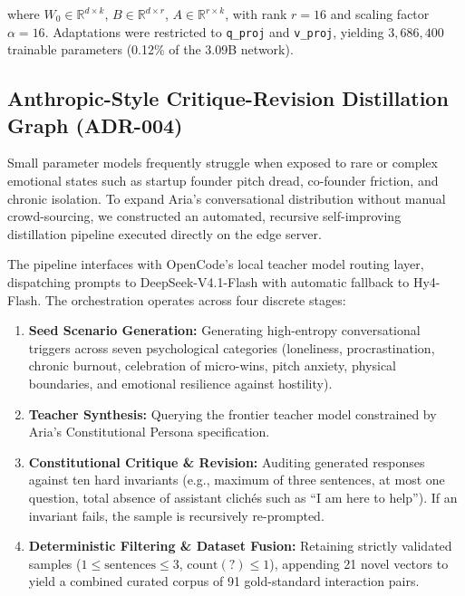 \documentclass[10pt,a4paper]{article}
\begin{document}
where $W_0 \in \mathbb{R}^{d \times k}$, $B \in \mathbb{R}^{d \times r}$, $A \in \mathbb{R}^{r \times k}$, with rank $r = 16$ and scaling factor $\alpha = 16$. Adaptations were restricted to \texttt{q\_proj} and \texttt{v\_proj}, yielding $3,686,400$ trainable parameters (0.12\% of the 3.09B network).

\subsection{Anthropic-Style Critique-Revision Distillation Graph (ADR-004)}
Small parameter models frequently struggle when exposed to rare or complex emotional states such as startup founder pitch dread, co-founder friction, and chronic isolation. To expand Aria's conversational distribution without manual crowd-sourcing, we constructed an automated, recursive self-improving distillation pipeline executed directly on the edge server.

The pipeline interfaces with OpenCode's local teacher model routing layer, dispatching prompts to DeepSeek-V4.1-Flash with automatic fallback to Hy4-Flash. The orchestration operates across four discrete stages:
\begin{enumerate}
    \item \textbf{Seed Scenario Generation:} Generating high-entropy conversational triggers across seven psychological categories (loneliness, procrastination, chronic burnout, celebration of micro-wins, pitch anxiety, physical boundaries, and emotional resilience against hostility).
    \item \textbf{Teacher Synthesis:} Querying the frontier teacher model constrained by Aria's Constitutional Persona specification.
    \item \textbf{Constitutional Critique \& Revision:} Auditing generated responses against ten hard invariants (e.g., maximum of three sentences, at most one question, total absence of assistant clichés such as ``I am here to help''). If an invariant fails, the sample is recursively re-prompted.
    \item \textbf{Deterministic Filtering \& Dataset Fusion:} Retaining strictly validated samples ($1 \le \text{sentences} \le 3$, $\text{count}(?) \le 1$), appending 21 novel vectors to yield a combined curated corpus of 91 gold-standard interaction pairs.
\end{enumerate}
\end{document}
